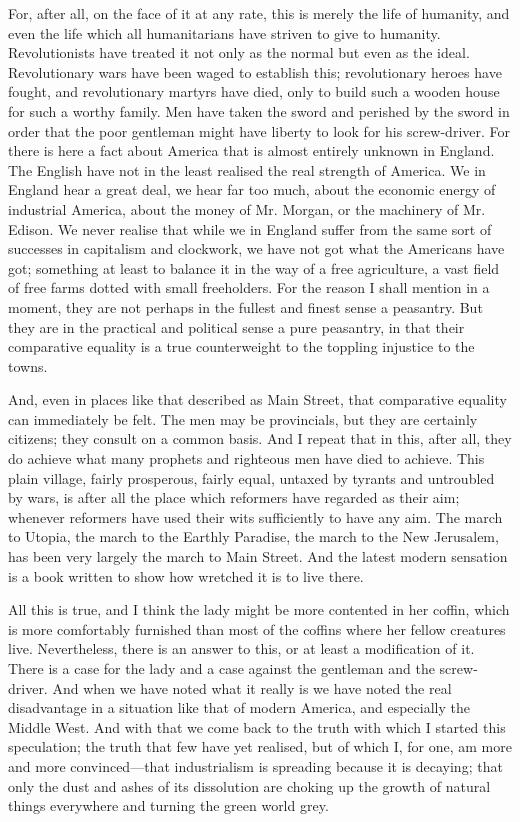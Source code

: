 \documentclass{book}
\begin{document}
For, after all, on the face of it at any rate, this is merely the life of humanity, and even the life which all humanitarians have striven to give to humanity. Revolutionists have treated it not only as the normal but even as the ideal. Revolutionary wars have been waged to establish this; revolutionary heroes have fought, and revolutionary martyrs have died, only to build such a wooden house for such a worthy family. Men have taken the sword and perished by the sword in order that the poor gentleman might have liberty to look for his screw-driver. For there is here a fact about America that is almost entirely unknown in England. The English have not in the least realised the real strength of America. We in England hear a great deal, we hear far too much, about the economic energy of industrial America, about the money of Mr. Morgan, or the machinery of Mr. Edison. We never realise that while we in England suffer from the same sort of successes in capitalism and clockwork, we have not got what the Americans have got; something at least to balance it in the way of a free agriculture, a vast field of free farms dotted with small freeholders. For the reason I shall mention in a moment, they are not perhaps in the fullest and finest sense a peasantry. But they are in the practical and political sense a pure peasantry, in that their comparative equality is a true counterweight to the toppling injustice to the towns.

And, even in places like that described as Main Street, that comparative equality can immediately be felt. The men may be provincials, but they are certainly citizens; they consult on a common basis. And I repeat that in this, after all, they do achieve what many prophets and righteous men have died to achieve. This plain village, fairly prosperous, fairly equal, untaxed by tyrants and untroubled by wars, is after all the place which reformers have regarded as their aim; whenever reformers have used their wits sufficiently to have any aim. The march to Utopia, the march to the Earthly Paradise, the march to the New Jerusalem, has been very largely the march to Main Street. And the latest modern sensation is a book written to show how wretched it is to live there.

All this is true, and I think the lady might be more contented in her coffin, which is more comfortably furnished than most of the coffins where her fellow creatures live. Nevertheless, there is an answer to this, or at least a modification of it. There is a case for the lady and a case against the gentleman and the screw-driver. And when we have noted what it really is we have noted the real disadvantage in a situation like that of modern America, and especially the Middle West. And with that we come back to the truth with which I started this speculation; the truth that few have yet realised, but of which I, for one, am more and more convinced—that industrialism is spreading because it is decaying; that only the dust and ashes of its dissolution are choking up the growth of natural things everywhere and turning the green world grey.
\end{document}
